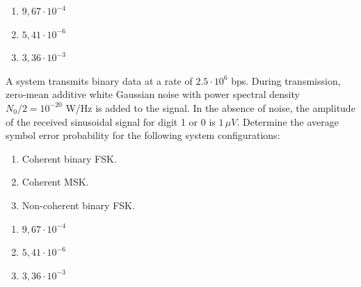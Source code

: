 \documentclass[es,boletin]{uah}
\begin{document}
{

\begin{enumerate}
	\item $9,67 \cdot 10^{-4}$
	\item $5,41 \cdot 10^{-6}$
	\item $3,36 \cdot 10^{-3}$
\end{enumerate}
}
{

\cite{Haykin} A system transmits binary data at a rate of $2.5 \cdot 10^6$ bps. During transmission, zero-mean additive white Gaussian noise with power spectral density $N_0/2 = 10^{-20}$ W/Hz is added to the signal. In the absence of noise, the amplitude of the received sinusoidal signal for digit 1 or 0 is $1\,\mu V$. Determine the average symbol error probability for the following system configurations:

\begin{enumerate}
	\item Coherent binary FSK.
	\item Coherent MSK.
	\item Non-coherent binary FSK.
\end{enumerate}

}
{

\begin{enumerate}
	\item $9,67 \cdot 10^{-4}$
	\item $5,41 \cdot 10^{-6}$
	\item $3,36 \cdot 10^{-3}$
\end{enumerate}
}
\end{document}
